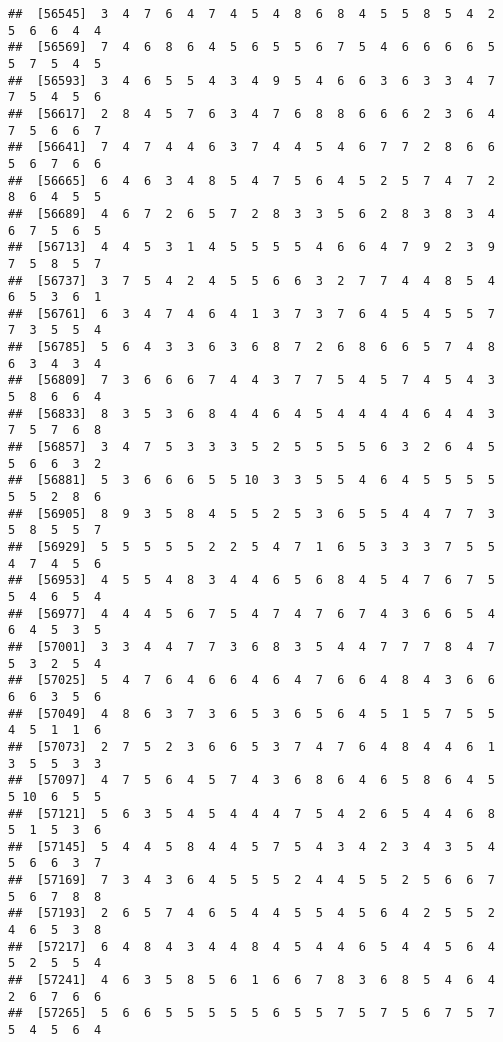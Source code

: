 \documentclass[
]{book}
\begin{document}
\begin{verbatim}
##  [56545]  3  4  7  6  4  7  4  5  4  8  6  8  4  5  5  8  5  4  2  5  6  6  4  4
##  [56569]  7  4  6  8  6  4  5  6  5  5  6  7  5  4  6  6  6  6  5  5  7  5  4  5
##  [56593]  3  4  6  5  5  4  3  4  9  5  4  6  6  3  6  3  3  4  7  7  5  4  5  6
##  [56617]  2  8  4  5  7  6  3  4  7  6  8  8  6  6  6  2  3  6  4  7  5  6  6  7
##  [56641]  7  4  7  4  4  6  3  7  4  4  5  4  6  7  7  2  8  6  6  5  6  7  6  6
##  [56665]  6  4  6  3  4  8  5  4  7  5  6  4  5  2  5  7  4  7  2  8  6  4  5  5
##  [56689]  4  6  7  2  6  5  7  2  8  3  3  5  6  2  8  3  8  3  4  6  7  5  6  5
##  [56713]  4  4  5  3  1  4  5  5  5  5  4  6  6  4  7  9  2  3  9  7  5  8  5  7
##  [56737]  3  7  5  4  2  4  5  5  6  6  3  2  7  7  4  4  8  5  4  6  5  3  6  1
##  [56761]  6  3  4  7  4  6  4  1  3  7  3  7  6  4  5  4  5  5  7  7  3  5  5  4
##  [56785]  5  6  4  3  3  6  3  6  8  7  2  6  8  6  6  5  7  4  8  6  3  4  3  4
##  [56809]  7  3  6  6  6  7  4  4  3  7  7  5  4  5  7  4  5  4  3  5  8  6  6  4
##  [56833]  8  3  5  3  6  8  4  4  6  4  5  4  4  4  4  6  4  4  3  7  5  7  6  8
##  [56857]  3  4  7  5  3  3  3  5  2  5  5  5  5  6  3  2  6  4  5  5  6  6  3  2
##  [56881]  5  3  6  6  6  5  5 10  3  3  5  5  4  6  4  5  5  5  5  5  5  2  8  6
##  [56905]  8  9  3  5  8  4  5  5  2  5  3  6  5  5  4  4  7  7  3  5  8  5  5  7
##  [56929]  5  5  5  5  5  2  2  5  4  7  1  6  5  3  3  3  7  5  5  4  7  4  5  6
##  [56953]  4  5  5  4  8  3  4  4  6  5  6  8  4  5  4  7  6  7  5  5  4  6  5  4
##  [56977]  4  4  4  5  6  7  5  4  7  4  7  6  7  4  3  6  6  5  4  6  4  5  3  5
##  [57001]  3  3  4  4  7  7  3  6  8  3  5  4  4  7  7  7  8  4  7  5  3  2  5  4
##  [57025]  5  4  7  6  4  6  6  4  6  4  7  6  6  4  8  4  3  6  6  6  6  3  5  6
##  [57049]  4  8  6  3  7  3  6  5  3  6  5  6  4  5  1  5  7  5  5  4  5  1  1  6
##  [57073]  2  7  5  2  3  6  6  5  3  7  4  7  6  4  8  4  4  6  1  3  5  5  3  3
##  [57097]  4  7  5  6  4  5  7  4  3  6  8  6  4  6  5  8  6  4  5  5 10  6  5  5
##  [57121]  5  6  3  5  4  5  4  4  4  7  5  4  2  6  5  4  4  6  8  5  1  5  3  6
##  [57145]  5  4  4  5  8  4  4  5  7  5  4  3  4  2  3  4  3  5  4  5  6  6  3  7
##  [57169]  7  3  4  3  6  4  5  5  5  2  4  4  5  5  2  5  6  6  7  5  6  7  8  8
##  [57193]  2  6  5  7  4  6  5  4  4  5  5  4  5  6  4  2  5  5  2  4  6  5  3  8
##  [57217]  6  4  8  4  3  4  4  8  4  5  4  4  6  5  4  4  5  6  4  5  2  5  5  4
##  [57241]  4  6  3  5  8  5  6  1  6  6  7  8  3  6  8  5  4  6  4  2  6  7  6  6
##  [57265]  5  6  6  5  5  5  5  5  6  5  5  7  5  7  5  6  7  5  7  5  4  5  6  4

\end{verbatim}
\end{document}
